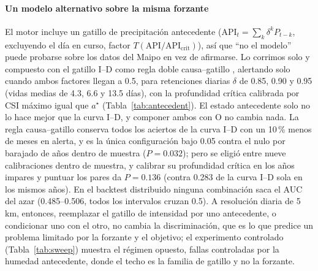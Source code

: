 \documentclass[authoryear,preprint,review,12pt]{elsarticle}
\begin{document}
\paragraph{Un modelo alternativo sobre la misma forzante}
El motor incluye un gatillo de precipitación antecedente (API$_t=\sum_k \delta^k P_{t-k}$,
excluyendo el día en curso, factor $T(\mathrm{API}/\mathrm{API}_\mathrm{crit})$), así que ``no el modelo'' puede probarse sobre los
datos del Maipo en vez de afirmarse. Lo corrimos solo y compuesto con el gatillo I--D
como regla doble causa--gatillo \citep{bogaard2018}, alertando solo cuando ambos
factores llegan a 0.5, para retenciones diarias $\delta$ de 0.85, 0.90 y 0.95 (vidas
medias de 4.3, 6.6 y 13.5 días), con la profundidad crítica calibrada por CSI máximo
igual que $a^\star$ (Tabla~\ref{tab:antecedent}). El estado antecedente solo no lo hace
mejor que la curva I--D, y componer ambos con O no cambia nada. La regla causa--gatillo
conserva todos los aciertos de la curva I--D con un 10\,\% menos de meses en alerta, y es
la única configuración bajo 0.05 contra el nulo por barajado de años dentro de muestra
($P=0.032$); pero se eligió entre nueve calibraciones dentro de muestra, y calibrar su
profundidad crítica en los años impares y puntuar los pares da $P=0.136$ (contra 0.283
de la curva I--D sola en los mismos años). En el backtest distribuido ninguna
combinación saca el AUC del azar (0.485--0.506, todos los intervalos cruzan 0.5). A
resolución diaria de 5\,km, entonces, reemplazar el gatillo de intensidad por uno
antecedente, o condicionar uno con el otro, no cambia la discriminación, que es lo que
predice un problema limitado por la forzante y el objetivo; el experimento controlado
(Tabla~\ref{tab:sweep}) muestra el régimen opuesto, fallas controladas por la humedad
antecedente, donde el techo es la familia de gatillo y no la forzante.
\end{document}
